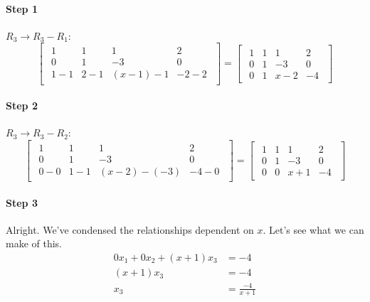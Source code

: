 \documentclass{article}
\begin{document}
            \paragraph{Step 1}
                $R_3 \rightarrow R_3 - R_1$:
                \[
                \begin{bmatrix}
                \begin{array}{ccc|c}
                    1 & 1 & 1 & 2 \\
                    0 & 1 & -3 & 0 \\
                    1-1 & 2-1 & (x-1)-1 & -2-2
                \end{array}
                \end{bmatrix}
                =
                \begin{bmatrix}
                \begin{array}{ccc|c}
                    1 & 1 &   1 &  2\\
                    0 & 1 &  -3 &  0\\
                    0 & 1 & x-2 & -4
                \end{array}
                \end{bmatrix}
                \]
            \paragraph{Step 2}
                $R_3 \rightarrow R_3 - R_2$:
                \[
                \begin{bmatrix}
                \begin{array}{ccc|c}
                    1 & 1 & 1 & 2 \\
                    0 & 1 & -3 & 0 \\
                    0-0 & 1-1 & (x-2)-(-3) & -4-0
                \end{array}
                \end{bmatrix}
                =
                \begin{bmatrix}
                \begin{array}{ccc|c}
                    1 & 1 &   1 &  2\\
                    0 & 1 &  -3 &  0\\
                    0 & 0 & x+1 & -4
                \end{array}
                \end{bmatrix}
                \]
            \paragraph{Step 3}
                Alright. We've condensed the relationships dependent on $x$.
                Let's see what we can make of this.
                \begin{align*}
                    0x_1 + 0x_2 + (x+1)x_3 &= -4 \\
                    (x+1)x_3 &= -4 \\
                    x_3 &= \frac{-4}{x+1} \\
                \end{align*}
\end{document}
